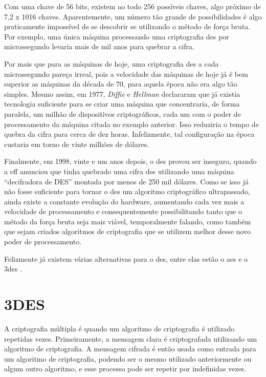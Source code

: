 Com uma chave de 56 bits, existem ao todo 256 possíveis chaves, algo próximo de 7,2 x 1016 chaves. Aparentemente, um número tão grande de possibilidades é algo praticamente impossível de se descobrir se utilizando o método de força bruta. Por exemplo, uma única máquina processando uma criptografia \acrshort{des} por microssegundo levaria mais de mil anos para quebrar a cifra.

Por mais que para as máquinas de hoje, uma criptografia \acrshort{des} a cada microssegundo pareça irreal, pois a velocidade das máquinas de hoje já é bem superior as máquinas da década de 70, para aquela época não era algo tão simples. Mesmo assim, em 1977, \textit{Diffie} e \textit{Hellman} declararam que já existia tecnologia suficiente para se criar uma máquina que concentraria, de forma paralela, um milhão de dispositivos criptográficos, cada um com o poder de processamento da máquina citada no exemplo anterior. Isso reduziria o tempo de quebra da cifra para cerca de dez horas. Infelizmente, tal configuração na época custaria em torno de vinte milhões de dólares.

Finalmente, em 1998, vinte e um anos depois, o \acrshort{des} provou ser inseguro, quando a \acrfull{eff} anunciou que tinha quebrado uma cifra \acrshort{des} utilizando uma máquina “decifradora de DES” montada por menos de 250 mil dólares. Como se isso já não fosse suficiente para tornar o \acrshort{des} um algoritmo criptográfico ultrapassado, ainda existe a constante evolução do hardware, aumentando cada vez mais a velocidade de processamento e consequentemente possibilitando tanto que o método da força bruta seja mais viável, temporalmente falando, como também que sejam criados algoritmos de criptografia que se utilizem melhor desse novo poder de processamento.

Felizmente já existem várias alternativas para o \acrshort{des}, entre elas estão o \acrfull{aes} e o \acrfull{3des} \cite{stallings14}.

\section{3DES}
\label{sec:3des}
A criptografia múltipla é quando um algoritmo de criptografia é utilizado repetidas vezes. Primeiramente, a mensagem clara é criptografada utilizando um algoritmo de criptografia. A mensagem cifrada é então usada como entrada para um algoritmo de criptografia, podendo ser o mesmo utilizado anteriormente ou algum outro algoritmo, e esse processo pode ser repetir por indefinidas vezes.

